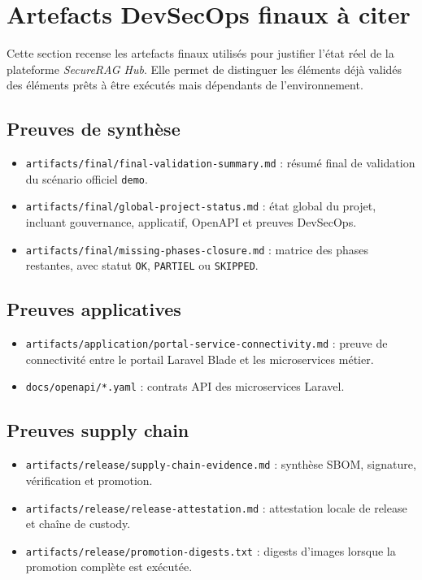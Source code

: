 \section{Artefacts DevSecOps finaux à citer}

Cette section recense les artefacts finaux utilisés pour justifier l'état réel
de la plateforme \textit{SecureRAG Hub}. Elle permet de distinguer les éléments
déjà validés des éléments prêts à être exécutés mais dépendants de
l'environnement.

\subsection{Preuves de synthèse}

\begin{itemize}
  \item \texttt{artifacts/final/final-validation-summary.md} : résumé final de
  validation du scénario officiel \texttt{demo}.
  \item \texttt{artifacts/final/global-project-status.md} : état global du
  projet, incluant gouvernance, applicatif, OpenAPI et preuves DevSecOps.
  \item \texttt{artifacts/final/missing-phases-closure.md} : matrice des phases
  restantes, avec statut \texttt{OK}, \texttt{PARTIEL} ou \texttt{SKIPPED}.
\end{itemize}

\subsection{Preuves applicatives}

\begin{itemize}
  \item \texttt{artifacts/application/portal-service-connectivity.md} : preuve
  de connectivité entre le portail Laravel Blade et les microservices métier.
  \item \texttt{docs/openapi/*.yaml} : contrats API des microservices Laravel.
\end{itemize}

\subsection{Preuves supply chain}

\begin{itemize}
  \item \texttt{artifacts/release/supply-chain-evidence.md} : synthèse SBOM,
  signature, vérification et promotion.
  \item \texttt{artifacts/release/release-attestation.md} : attestation locale
  de release et chaîne de custody.
  \item \texttt{artifacts/release/promotion-digests.txt} : digests d'images
  lorsque la promotion complète est exécutée.
\end{itemize}

